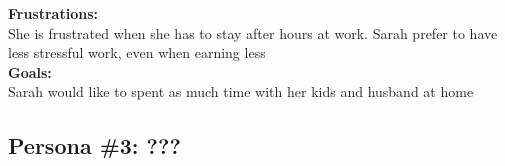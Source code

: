 \documentclass[a4paper,10pt,oneside]{scrreprt}
\begin{document}
		\textbf{Frustrations:}\\
				She is frustrated when she has to stay after hours at work. Sarah prefer to have less stressful work, even when earning less\\
				
		\textbf{Goals:}\\
				Sarah would like to spent as much time with her kids and husband at home\\
				
		
		\subsection{Persona \#3: ???}
\end{document}
